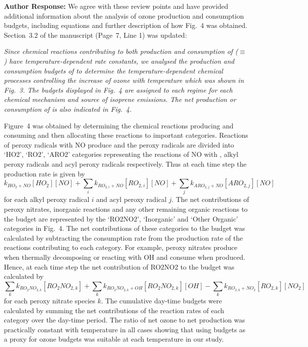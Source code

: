 \documentclass{article}
\begin{document}
\textbf{Author Response:} We agree with these review points and have provided additional information about the analysis of ozone production and consumption budgets, including equations and further description of how Fig.~4 was obtained. Section~3.2 of the manuscript (Page~7, Line 1) was updated:
{\itshape
Since chemical reactions contributing to both production and consumption of  ($\equiv$ ) have temperature-dependent rate constants, we analysed the production and consumption budgets of  to determine the temperature-dependent chemical processes controlling the increase of ozone with temperature which was shown in Fig.~3.
The  budgets displayed in Fig.~4 are assigned to each  regime for each chemical mechanism and source of isoprene emissions.
The net production or consumption of  is also indicated in Fig.~4.

Figure~4 was obtained by determining the chemical reactions producing and consuming  and then allocating these reactions to important categories.
Reactions of peroxy radicals with NO produce  and the peroxy radicals are divided into `HO2', `RO2', `ARO2' categories representing the reactions of NO with , alkyl peroxy radicals and acyl peroxy radicals respectively.
Thus at each time step the  production rate is given by 
\begin{equation}
    k_{HO_2 + NO}[HO_2][NO] + \sum_i{k_{RO_{2,i} + NO}[RO_{2,i}][NO]} + \sum_j{k_{ARO_{2,j} + NO}[ARO_{2,j}][NO]}
\end{equation}
for each alkyl peroxy radical $i$ and acyl peroxy radical $j$.
The net contributions of peroxy nitrates, inorganic reactions and any other remaining organic reactions to the  budget are represented by the `RO2NO2', `Inorganic' and `Other Organic' categories in Fig.~4.
The net contributions of these categories to the  budget was calculated by subtracting the consumption rate from the production rate of the reactions contributing to each category.
For example, peroxy nitrates produce  when thermally decomposing or reacting with OH and consume  when produced.
Hence, at each time step the net contribution of RO2NO2 to the  budget was calculated by
\begin{equation}
    \sum_k{k_{RO_2NO_{2,k}}[RO_2NO_{2,k}]} + \sum_k{k_{RO_2NO_{2,k} + OH}[RO_2NO_{2,k}][OH]} - \sum_k{k_{RO_{2,k} + NO_2}[RO_{2,k}][NO_2]}
\end{equation}
for each peroxy nitrate species $k$.
The cumulative day-time budgets were calculated by summing the net contributions of the reaction rates of each category over the day-time period.
The ratio of net ozone to net  production was practically constant with temperature in all cases showing that using  budgets as a proxy for ozone budgets was suitable at each temperature in our study.
}
\end{document}
